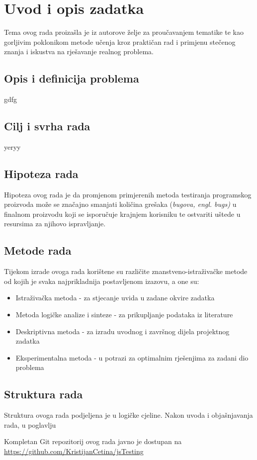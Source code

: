 \chapter{Uvod i opis zadatka}\label{OpisIOgranicenja}
Tema ovog rada proizašla je iz autorove želje za proučavanjem tematike te kao gorljivim poklonikom metode učenja kroz praktičan rad i primjenu stečenog znanja i iskustva na rješavanje realnog problema.


\section{Opis i definicija problema}
gdfg

\section{Cilj i svrha rada}
yeryy

\section{Hipoteza rada}
Hipoteza ovog rada je da promjenom primjerenih metoda testiranja programskog proizvoda može se značajno smanjati količina grešaka (\textit{bugova, engl. bugs)} u finalnom proizvodu koji se isporučuje krajnjem korisniku te ostvariti uštede u resursima za njihovo ispravljanje.

\section{Metode rada}
Tijekom izrade ovoga rada korištene su različite znanstveno-istraživačke metode od kojih je svaka najprikladnija postavljenom izazovu, a one su:
\begin{itemize}
\item Istraživačka metoda - za stjecanje uvida u zadane okvire zadatka
\item Metoda logičke analize i sinteze - za prikupljanje podataka iz literature
\item Deskriptivna metoda - za izradu uvodnog i završnog dijela projektnog zadatka
\item Eksperimentalna metoda - u potrazi za optimalnim rješenjima za zadani dio problema
\end{itemize}

\section{Struktura rada}
Struktura ovoga rada podjeljena je u logičke cjeline.
Nakon uvoda i objašnjavanja rada, u poglavlju 

Kompletan Git repozitorij ovog rada javno je dostupan na \url{https://github.com/KristijanCetina/jsTesting}